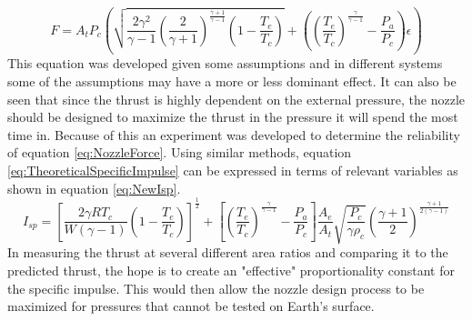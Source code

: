 \begin{equation}\label{eq:NozzleForce}
F = A_t P_c \left(\sqrt{\frac{2\gamma^2}{\gamma-1}\left(\frac{2}{\gamma+1}\right)^{\frac{\gamma+1}{\gamma-1}}\left(1-\frac{T_e}{T_c}\right)}+\left(\left(\frac{T_e}{T_c}\right)^{\frac{\gamma}{\gamma-1}}-\frac{P_a}{P_c}\right)\epsilon\right)
\end{equation}
This equation was developed given some assumptions and in different systems some of the assumptions may have a more or less dominant effect. It can also be seen that since the thrust is highly dependent on the external pressure, the nozzle should be designed to maximize the thrust in the pressure it will spend the most time in. Because of this an experiment was developed to determine the reliability of equation \ref{eq:NozzleForce}. Using similar methods, equation \ref{eq:TheoreticalSpecificImpulse} can be expressed in terms of relevant variables as shown in equation \ref{eq:NewIsp}.
\begin{equation}\label{eq:NewIsp}
I_{sp}=\left[\frac{2\gamma R T_c}{W(\gamma-1)}\left(1-\frac{T_e}{T_c}\right)\right]^{\frac{1}{2}}+\left[\left(\frac{T_e}{T_c}\right)^{\frac{\gamma}{\gamma-1}}-\frac{P_a}{P_c}\right]\frac{A_e}{A_t}\sqrt{\frac{P_c}{\gamma\rho_c}}\left(\frac{\gamma+1}{2}\right)^{\frac{\gamma+1}{2(\gamma-1)}}
\end{equation} 
In measuring the thrust at several different area ratios and comparing it to the predicted thrust, the hope is to create an "effective" proportionality constant for the specific impulse. This would then allow the nozzle design process to be maximized for pressures that cannot be tested on Earth's surface.
